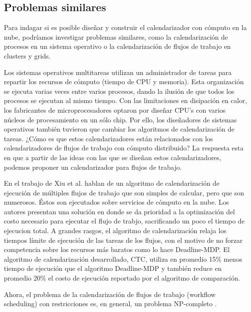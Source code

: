 \documentclass[letterpaper]{report}
\begin{document}
\subsection{Problemas similares}

Para indagar si es posible diseñar y construir el calendarizador con cómputo en la nube, podríamos investigar problemas similares, como la calendarización de procesos en un sistema operativo o la calendarización de flujos de trabajo en clusters y grids.

Los sistemas operativos multitareas utilizan un administrador de tareas para repartir los recursos de cómputo (tiempo de CPU y memoria). Esta organización se ejecuta varias veces entre varios procesos, dando la ilusión de que todos los procesos se ejecutan al mismo tiempo. Con las limitaciones en disipación en calor, los fabricantes de microprocesadores optaron por diseñar CPU's con varios núcleos de procesamiento en un sólo chip. Por ello, los diseñadores de sistemas operativos también tuvieron que cambiar los algoritmos de calendarización de tareas. ¿Cómo es que estos calendarizadores están relacionados con los calendarizadores de flujos de trabajo con cómputo distribuido? La respuesta esta en que a partir de las ideas con las que se diseñan estos calendarizadores, podemos proponer un calendarizador para flujos de trabajo.

En el trabajo de Xiu et al. \cite{liu2010compromised} hablan de un algoritmo de calendarización de ejecución de múltiples flujos de trabajo que son simples de calcular, pero que son numerosos. Éstos son ejecutados sobre servicios de cómputo en la nube. Los autores presentan una solución en donde se da prioridad a la optimización del costo necesario para ejecutar el flujo de trabjo, sacrificando un poco el tiempo de ejecucion total. A grandes rasgos, el algoritmo de calendarización relaja los tiempos límite de ejecución de las tareas de los flujos, con el motivo de no forzar competencia sobre los recursos más baratos como lo hace Deadline-MDP. El algoritmo de calendarización desarrollado, CTC, 
utiliza en promedio 15\% menos tiempo de ejecución que el algoritmo Deadline-MDP y también reduce en promedio 20\% el costo de ejecución reportado por el algoritmo de comparación.

Ahora, el problema de la calendarización de flujos de trabajo (workflow scheduling) con restricciones es, en general, un problema NP-completo \cite{wieczorek2009towards}.
\end{document}
